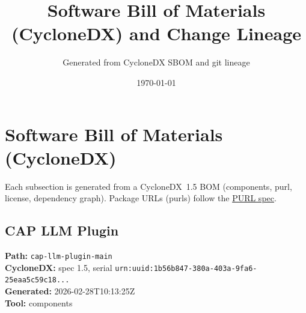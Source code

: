 \documentclass[11pt,a4paper]{article}
\title{\textbf{Software Bill of Materials (CycloneDX) and Change Lineage}}
\author{Generated from CycloneDX SBOM and git lineage}
\date{\today}
\begin{document}
\maketitle
\tableofcontents
\newpage
\section{Software Bill of Materials (CycloneDX)}
Each subsection is generated from a CycloneDX~1.5 BOM (components, purl, license, dependency graph). Package URLs (purls) follow the \href{https://github.com/package-url/purl-spec}{PURL spec}.

\subsection{CAP LLM Plugin}
\textbf{Path:} \texttt{cap-llm-plugin-main}
\\ \textbf{CycloneDX:} spec 1.5, serial \texttt{urn:uuid:1b56b847-380a-403a-9fa6-25eaa5c59c18...}
\\ \textbf{Generated:} 2026-02-28T10:13:25Z
\\ \textbf{Tool:} components
\end{document}
